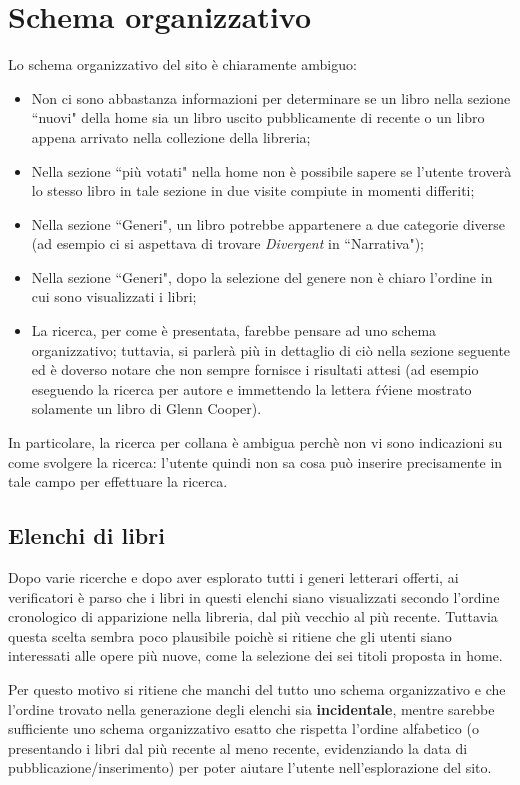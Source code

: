 \section{Schema organizzativo}\label{sec:schema-org}
Lo schema organizzativo del sito è chiaramente ambiguo:
\begin{itemize}
\item Non ci sono abbastanza informazioni per determinare se un libro nella
sezione ``nuovi" della home sia un libro uscito pubblicamente di recente o un
libro appena arrivato nella collezione della libreria;
\item Nella sezione ``più votati" nella home non è possibile sapere se
l'utente troverà lo stesso libro in tale sezione in due visite compiute in
momenti differiti;
\item Nella sezione ``Generi", un libro potrebbe appartenere a due categorie
diverse (ad esempio ci si aspettava di trovare \textit{Divergent} in
``Narrativa");
\item Nella sezione ``Generi", dopo la selezione del genere non è chiaro
l'ordine in cui sono visualizzati i libri;
\item La ricerca, per come è presentata, farebbe pensare ad uno schema
organizzativo; tuttavia, si parlerà più in dettaglio di ciò nella sezione
seguente ed è doverso notare che non sempre fornisce i risultati attesi (ad
esempio eseguendo la ricerca per autore e immettendo la lettera \'r\' viene
mostrato solamente un libro di Glenn Cooper).
\end{itemize}

In particolare, la ricerca per collana è ambigua perchè non vi sono
indicazioni su come svolgere la ricerca: l'utente quindi non sa cosa può
inserire precisamente in tale campo per effettuare la ricerca.

\subsection{Elenchi di libri}\label{sec:schema-elenchi}
Dopo varie ricerche e dopo aver esplorato tutti i generi letterari offerti, ai
verificatori è parso che i libri in questi elenchi siano visualizzati secondo
l'ordine cronologico di apparizione nella libreria, dal più vecchio al
più recente. Tuttavia questa scelta sembra poco plausibile poichè si ritiene
che gli utenti siano interessati alle opere più nuove, come la selezione dei
sei titoli proposta in home.

Per questo motivo si ritiene che manchi del tutto uno schema organizzativo e
che l'ordine trovato nella generazione degli elenchi sia \textbf{incidentale},
mentre sarebbe sufficiente uno schema organizzativo esatto che rispetta
l'ordine alfabetico (o presentando i libri dal più recente al meno recente,
evidenziando la data di pubblicazione/inserimento) per poter aiutare l'utente
nell'esplorazione del sito.